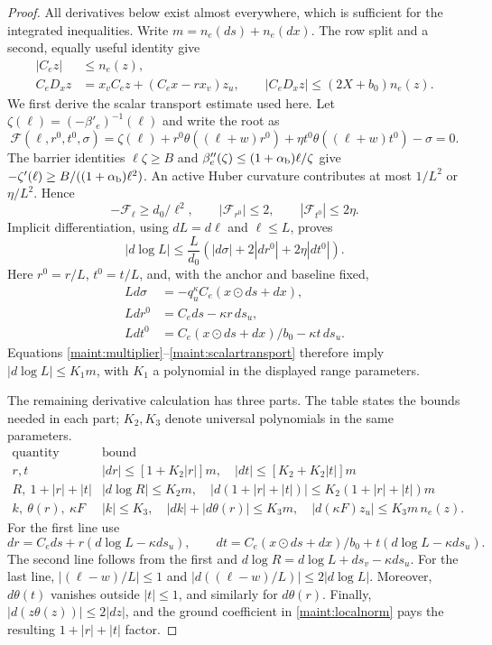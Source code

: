 \documentclass[11pt]{article}
\theoremstyle{definition}\newtheorem{definition}[theorem]{Definition}
\theoremstyle{remark}\newtheorem{remark}[theorem]{Remark}
\begin{document}
\begin{proof}
All derivatives below exist almost everywhere, which is sufficient for
the integrated inequalities. Write $m=n_e(ds)+n_e(dx)$.
The row split and a second, equally useful identity give
\begin{align}
 |C_ez|&\leq n_e(z),\nonumber\\
 C_eD_xz&=x_vC_ez+(C_ex-rx_v)z_u,
 \qquad
 |C_eD_xz|\leq(2X+b_0)n_e(z).
 \label{maint:multiplier}
\end{align}
We first derive the scalar transport estimate used here. Let
$\zeta(\ell)=(-\beta'_e)^{-1}(\ell)$ and write the root as
\[
 \mathcal F(\ell,r^0,t^0,\sigma)
 =\zeta(\ell)+r^0\theta((\ell+w)r^0)
       +\eta t^0\theta((\ell+w)t^0)-\sigma=0.
\]
The barrier identities $\ell\zeta\geq B$ and
$\beta''_e(\zeta)\leq(1+\alpha_{\rm b})\ell/\zeta$ give
$-\zeta'(\ell)\geq B/((1+\alpha_{\rm b})\ell^2)$. An active Huber
curvature contributes at most $1/L^2$ or $\eta/L^2$. Hence
\[
 -\mathcal F_\ell\geq d_0/\ell^2,\qquad
 |\mathcal F_{r^0}|\leq2,\qquad
 |\mathcal F_{t^0}|\leq2\eta.
\]
Implicit differentiation, using $dL=d\ell$ and $\ell\leq L$, proves
\begin{equation}
 |d\log L|\leq\frac L{d_0}
       (|d\sigma|+2|dr^0|+2\eta|dt^0|).
 \label{maint:scalartransport}
\end{equation}
Here $r^0=r/L$, $t^0=t/L$, and, with the anchor and baseline fixed,
\[
 \begin{aligned}
 Ld\sigma&=-q_u^\kappa C_e(x\odot ds+dx),\\
 Ldr^0&=C_e ds-\kappa r\,ds_u,\\
 Ldt^0&=C_e(x\odot ds+dx)/b_0-\kappa t\,ds_u.
 \end{aligned}
\]
Equations \eqref{maint:multiplier}--\eqref{maint:scalartransport}
therefore imply $|d\log L|\leq K_1m$, with $K_1$ a polynomial in the
displayed range parameters.

The remaining derivative calculation has three parts. The table states
the bounds needed in each part; $K_2,K_3$ denote universal polynomials
in the same parameters.
\[
\begin{array}{c|l}
 \text{quantity}&\text{bound}\\ \hline
 r,t&
 |dr|\leq[1+K_2|r|]m,\quad
 |dt|\leq[K_2+K_2|t|]m\\[2pt]
 R,\ 1+|r|+|t|&
 |d\log R|\leq K_2m,\quad
 |d(1+|r|+|t|)|\leq K_2(1+|r|+|t|)m\\[2pt]
 k,\ \theta(r),\ \kappa F&
 |k|\leq K_3,\quad |dk|+|d\theta(r)|\leq K_3m,\quad
 |d(\kappa F)z_u|\leq K_3m\,n_e(z).
\end{array}
\]
For the first line use
\[
 dr=C_e ds+r(d\log L-\kappa ds_u),\qquad
 dt=C_e(x\odot ds+dx)/b_0+t(d\log L-\kappa ds_u).
\]
The second line follows from the first and
$d\log R=d\log L+ds_v-\kappa ds_u$.
For the last line, $|(\ell-w)/L|\leq1$ and
$|d((\ell-w)/L)|\leq2|d\log L|$. Moreover, $d\theta(t)$ vanishes
outside $|t|\leq1$, and similarly for $d\theta(r)$. Finally,
$|d(z\theta(z))|\leq2|dz|$, and the ground coefficient in
\eqref{maint:localnorm} pays the resulting $1+|r|+|t|$ factor.


\end{proof}
\end{document}
